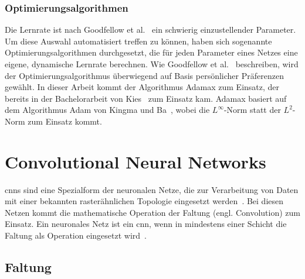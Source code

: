 \subsubsection{Optimierungsalgorithmen}
Die Lernrate ist nach Goodfellow et al.~\cite[S.~342]{goodfellowDeepLearningUmfassende2018} ein schwierig einzustellender Parameter. Um diese Auswahl automatisiert treffen zu können, haben sich sogenannte Optimierungsalgorithmen durchgesetzt, die für jeden Parameter eines Netzes eine eigene, dynamische Lernrate berechnen. Wie Goodfellow et al.~\cite[S.~347]{goodfellowDeepLearningUmfassende2018} beschreiben, wird der Optimierungsalgorithmus überwiegend auf Basis persönlicher Präferenzen gewählt. In dieser Arbeit kommt der Algorithmus Adamax zum Einsatz, der bereits in der Bachelorarbeit von Kies~\cite{kiesEntwicklungUndAnalyse2020} zum Einsatz kam. Adamax basiert auf dem Algorithmus Adam von Kingma und Ba~\cite{kingmaAdamMethodStochastic2017}, wobei die $L^\infty$-Norm statt der $L^2$-Norm zum Einsatz kommt.

\section{Convolutional Neural Networks}
\glspl{cnn} sind eine Spezialform der neuronalen Netze, die zur Verarbeitung von Daten mit einer bekannten rasterähnlichen Topologie eingesetzt werden~\cite[S. 369]{goodfellowDeepLearningUmfassende2018}. Bei diesen Netzen kommt die mathematische Operation der Faltung (engl. Convolution) zum Einsatz. Ein neuronales Netz ist ein \gls{cnn}, wenn in mindestens einer Schicht die Faltung als Operation eingesetzt wird~\cite[S. 369]{goodfellowDeepLearningUmfassende2018}.


\subsection{Faltung}
\label{subsec:convolution}


